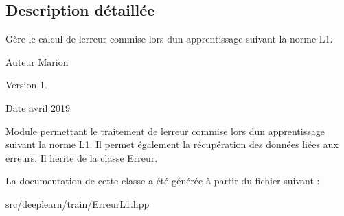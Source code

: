 \subsection{Description détaillée}
Gère le calcul de l\textquotesingle{}erreur commise lors d\textquotesingle{}un apprentissage suivant la norme L1. 

\begin{DoxyAuthor}{Auteur}
Marion 
\end{DoxyAuthor}
\begin{DoxyVersion}{Version}
1. 
\end{DoxyVersion}
\begin{DoxyDate}{Date}
avril 2019
\end{DoxyDate}
Module permettant le traitement de l\textquotesingle{}erreur commise lors d\textquotesingle{}un apprentissage suivant la norme L1. Il permet également la récupération des données liées aux erreurs. Il herite de la classe \hyperlink{classErreur}{Erreur}. 

La documentation de cette classe a été générée à partir du fichier suivant \+:\begin{DoxyCompactItemize}
\item 
src/deeplearn/train/Erreur\+L1.\+hpp\end{DoxyCompactItemize}
